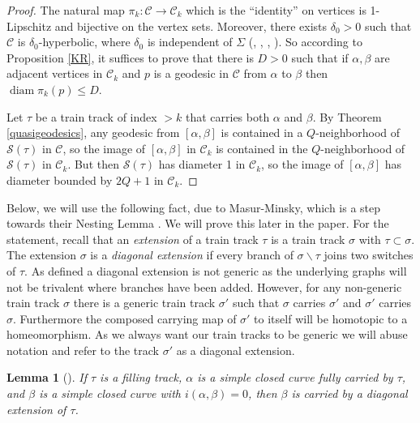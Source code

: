 \documentclass[11pt]{article}
\newtheorem{lemma}[thm]{Lemma}
\theoremstyle{remark}
\def\S{{\mathcal S}}
\def\diam{\operatorname{diam}}
\def\C{{\mathcal C}}
\begin{document}
\begin{proof}
  The natural map $\pi_k:\mathcal C\to \mathcal C_k$ which is the ``identity'' on
  vertices is
  1-Lipschitz and bijective on the vertex sets.
  Moreover, there exists $\delta_0>0$ such that $\mathcal C$ is
  $\delta_0$-hyperbolic, where $\delta_0$ is independent of
  $\Sigma$ (\cite{Aougab}, \cite{Bowditch}, \cite{CRS}, \cite{HPW}).
  So according to
  Proposition \ref{KR}, it suffices to prove that there is $D>0$
  such that
  if $\alpha,\beta$ are adjacent vertices in $\mathcal C_k$ and $p$ is a
  geodesic in $\mathcal C$ from $\alpha$ to $\beta$ then $\diam \pi_k(p)\leq D$.

  Let $\tau$ be a train track of index $>k$ that carries both $\alpha$ and
  $\beta$. By Theorem \ref{quasigeodesics},
  any geodesic from $[\alpha,\beta]$ is contained in a $Q$-neighborhood of
  $\S(\tau)$ in $\C$, so the image of $[\alpha,\beta]$ in $\C_k$ is contained
  in the $Q$-neighborhood of $\S(\tau)$ in $\C_k$. But then $\S(\tau)$ has
  diameter 1 in $\C_k$, so the image of $[\alpha,\beta]$ has diameter
  bounded by $2Q+1$ in $\C_k$.
\end{proof}


Below, we will use the following fact, due to Masur-Minsky, which is a step towards
their Nesting Lemma \cite[Lemma 4.7]{MM}. We will prove this later in the paper.
For the statement, recall that an \emph{extension} of a train track $\tau$
is a train track $\sigma$ with $\tau \subset \sigma$. The extension $\sigma$ is
a \emph{diagonal extension} if every branch of $\sigma \smallsetminus \tau$ joins two switches of
$\tau$. As defined a diagonal extension is not generic as the underlying graphs will not be trivalent where branches have been added.  However, for any non-generic train track $\sigma$ there is a generic train track $\sigma'$ such that $\sigma$ carries $\sigma'$ and $\sigma'$ carries $\sigma$. Furthermore the composed carrying map of $\sigma'$ to itself will be homotopic to a homeomorphism. As we always want our train tracks to be generic we will abuse notation and refer to the track $\sigma'$ as a diagonal extension.

\begin{lemma}[{\cite[Lemma 4.4]{MM}}]\label{MMdiag}
  If $\tau$ is a filling track, $\alpha$ is a simple closed curve fully carried
  by $\tau$, and $\beta$ is a simple closed curve with $i(\alpha,\beta)=0$,
  then $\beta$ is carried by a diagonal extension of $\tau$.
\end{lemma}
\end{document}
